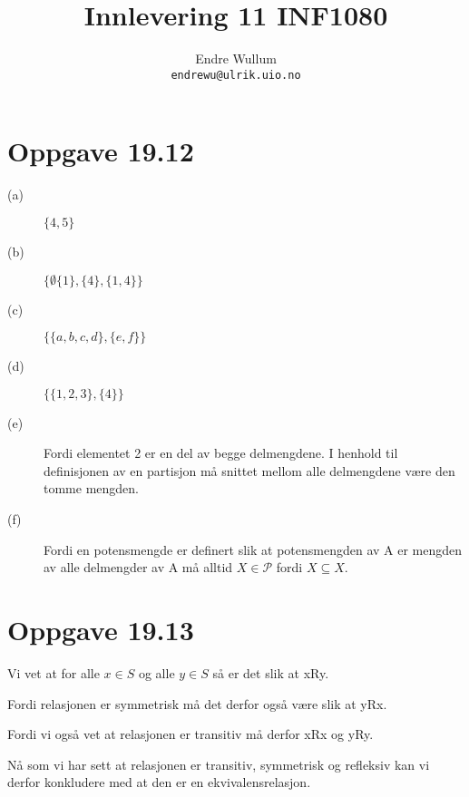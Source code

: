 \documentclass[12pt,norsk,a4paper]{article}
\title{Innlevering 11 INF1080}
\author{Endre Wullum\\ \texttt{endrewu@ulrik.uio.no}}
\begin{document}
\maketitle

\section*{Oppgave 19.12}
\begin{description}
\item[(a)]$\{4, 5\}$
\item[(b)]$\{\emptyset\{1\}, \{4\}, \{1,4\}\}$
\item[(c)]$\{\{a,b,c,d\},\{e,f\}\}$
\item[(d)]$\{\{1,2,3\},\{4\}\}$
\item[(e)]Fordi elementet 2 er en del av begge delmengdene. I henhold til definisjonen av en partisjon må snittet mellom alle delmengdene være den tomme mengden.
\item[(f)]Fordi en potensmengde er definert slik at potensmengden av A er mengden av alle delmengder av A må alltid $X \in \mathcal{P}$ fordi $X \subseteq X$.
\end{description}

\section*{Oppgave 19.13}
Vi vet at for alle $x \in S$ og alle $y \in S$ så er det slik at xRy.

Fordi relasjonen er symmetrisk må det derfor også være slik at yRx.

Fordi vi også vet at relasjonen er transitiv må derfor xRx og yRy.

Nå som vi har sett at relasjonen er transitiv, symmetrisk og refleksiv kan vi derfor konkludere med at den er en ekvivalensrelasjon.


\end{document}
